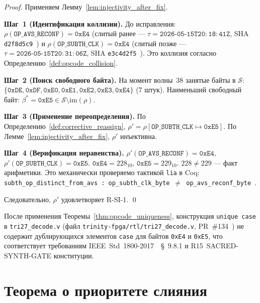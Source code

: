 \begin{proof}
Применяем Лемму~\ref{lem:injectivity_after_fix}.

\medskip
\noindent\textbf{Шаг~1 (Идентификация коллизии).}
До исправления: $\rho(\mathtt{OP\_AVS\_RECONF}) = \mathtt{0xE4}$
(слитый ранее — $\tau = \mathtt{2026\text{-}05\text{-}15T20:18:41Z}$,
SHA \texttt{d2f8d5c9}~\cite{pr655_t27})
и $\rho(\mathtt{OP\_SUBTH\_CLK}) = \mathtt{0xE4}$
(слитый позже — $\tau = \mathtt{2026\text{-}05\text{-}15T20:31:06Z}$,
SHA \texttt{e3c4d2f5}~\cite{pr660_t27}).
Это коллизия согласно Определению~\ref{def:opcode_collision}.

\medskip
\noindent\textbf{Шаг~2 (Поиск свободного байта).}
На момент волны~38 занятые байты в $\mathcal{S}$:
$\{\mathtt{0xDE}, \mathtt{0xDF}, \mathtt{0xE0}, \mathtt{0xE1},
\mathtt{0xE2}, \mathtt{0xE3}, \mathtt{0xE4}\}$ (7 штук).
Наименьший свободный байт: $\beta^* = \mathtt{0xE5} \in \mathcal{S}
\setminus \mathrm{im}(\rho)$.

\medskip
\noindent\textbf{Шаг~3 (Применение переопределения).}
По Определению~\ref{def:corrective_reassign},
$\rho' = \rho[\mathtt{OP\_SUBTH\_CLK} \mapsto \mathtt{0xE5}]$.
По Лемме~\ref{lem:injectivity_after_fix}, $\rho'$ инъективна.

\medskip
\noindent\textbf{Шаг~4 (Верификация неравенства).}
$\rho'(\mathtt{OP\_AVS\_RECONF}) = \mathtt{0xE4}$,
$\rho'(\mathtt{OP\_SUBTH\_CLK}) = \mathtt{0xE5}$.
$\mathtt{0xE4} = 228_{10}$, $\mathtt{0xE5} = 229_{10}$.
$228 \neq 229$ — факт арифметики.
Это механически проверяемо тактикой \texttt{lia} в Coq:
\texttt{subth\_op\_distinct\_from\_avs : op\_subth\_clk\_byte
$\neq$ op\_avs\_reconf\_byte}~\cite{pr661_t27}.

\medskip
Следовательно, $\rho'$ удовлетворяет R-SI-1. \qed
\end{proof}

\begin{corollary}
\label{cor:rtl_decoder_correct}
После применения Теоремы~\ref{thm:opcode_uniqueness},
конструкция \texttt{unique~case} в \texttt{tri27\_decode.v}
(файл \texttt{trinity-fpga/rtl/tri27\_decode.v},
PR~\#134~\cite{pr_trinity_fpga_134})
не содержит дублирующихся элементов \texttt{case} для байтов
\texttt{0xE4} и \texttt{0xE5}, что соответствует требованиям
IEEE~Std~1800-2017~\cite{ieee_sv_2017}~§~9.8.1 и
R15~SACRED-SYNTH-GATE конституции.
\end{corollary}

\section{Теорема о приоритете слияния}
\label{sec:merge_precedence}

